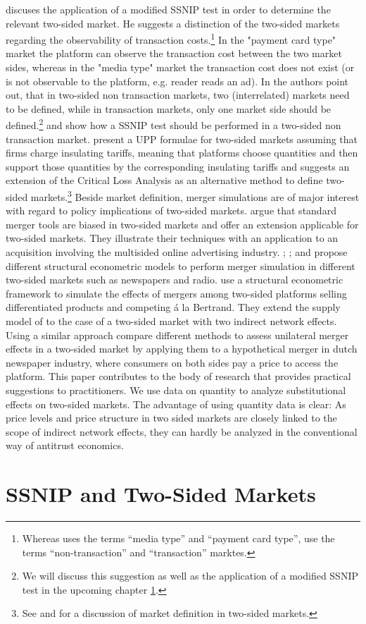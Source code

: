 \documentclass[10pt,a4paper]{scrreprt}
\begin{document}
\cite{filistrucchi_ssnip_2008} discuses the application of a modified SSNIP test in order to determine the relevant two-sided market. He suggests a distinction of the two-sided markets regarding the observability of transaction costs.\footnote{Whereas \cite{filistrucchi_ssnip_2008} uses the terms “media type” and “payment card type”, \cite{filistrucchi_market_2013} use the terms “non-transaction” and “transaction” marktes.} In the "payment card type" market the platform can observe the transaction cost between the two market sides, whereas in the "media type" market the transaction cost does not exist (or is not observable to the platform, e.g. reader reads an ad). In \cite{filistrucchi_market_2013} the authors point out, that in two-sided non transaction markets, two (interrelated) markets need to be defined, while in transaction markets, only one market side should be defined.\footnote{We will discuss this suggestion as well as the application of a modified SSNIP test in the upcoming chapter \ref{SSNIP}.} \cite{emch_market_2006} and \cite{alexandrov_antitrust_2011} show how a SSNIP test should be performed in a two-sided non transaction market. \cite{white_insulated_2012} present a UPP formulae for two-sided markets assuming that firms charge insulating tariffs, meaning that platforms choose quantities and then support those quantities by the corresponding insulating tariffs and \cite{noel_analyzing_2005} suggests an extension of the Critical Loss Analysis as an alternative method to define two-sided markets.\footnote{See \cite{evans_two-sided_2012} and \cite{filistrucchi_identifying_2012} for a discussion of market definition in two-sided markets.} Beside market definition, merger simulations are of major interest with regard to policy implications of two-sided markets. \cite{evans_analysis_2008} argue that standard merger tools are biased in two-sided markets and offer an extension applicable for two-sided markets. They illustrate their techniques with an application to an acquisition involving the multisided online advertising industry. \cite{fan_ownership_2013}; \cite{filistrucchi_merger_2010}; \cite{filistrucchi_assessing_2012} and \cite{jeziorski_merger_2010} propose different structural econometric models to perform merger simulation in different two-sided markets such as newspapers and radio. \cite{filistrucchi_merger_2010} use a structural econometric framework to simulate the effects of mergers among two-sided platforms selling differentiated products and competing á la Bertrand. They extend the supply model of \cite{argentesi_estimating_2007} to the case of a two-sided market with two indirect network effects. Using a similar approach \cite{filistrucchi_assessing_2012} compare different methods to assess unilateral merger effects in a two-sided market by applying them to a hypothetical merger in dutch newspaper industry, where consumers on both sides pay a price to access the platform. This paper contributes to the body of research that provides practical suggestions to practitioners. We use data on quantity to analyze substitutional effects on two-sided markets. The advantage of using quantity data is clear: As price levels and price structure in two sided markets are closely linked to the scope of indirect network effects, they can hardly be analyzed in the conventional way of antitrust economics. 
 



\chapter{SSNIP and Two-Sided Markets}\label{SSNIP}
\end{document}

